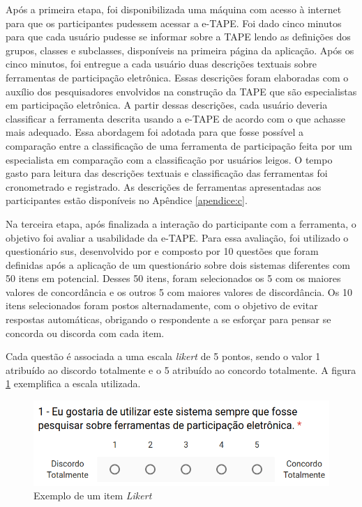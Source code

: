 \par
Após a primeira etapa, foi disponibilizada uma máquina com acesso à internet para que os participantes pudessem acessar a e-TAPE. Foi dado cinco minutos para que cada usuário pudesse se informar sobre a TAPE lendo as definições dos grupos, classes e subclasses,
disponíveis na primeira página da aplicação. 
Após os cinco minutos, foi entregue a cada usuário duas descrições textuais sobre ferramentas de participação eletrônica. Essas descrições foram elaboradas com o auxílio dos pesquisadores envolvidos na construção da TAPE que são especialistas em participação eletrônica. 
A partir dessas descrições, cada usuário deveria classificar a ferramenta descrita usando a e-TAPE de acordo com o que achasse mais adequado.
Essa abordagem foi adotada para que fosse possível a comparação entre a classificação de uma ferramenta de participação feita por um especialista em comparação com a classificação por usuários leigos. O tempo gasto para leitura das descrições textuais e classificação das ferramentas foi cronometrado e registrado.
As descrições de ferramentas apresentadas aos participantes estão disponíveis no Apêndice \ref{apendice:c}.

\par
Na terceira etapa, após finalizada a interação do participante com a ferramenta, o objetivo foi avaliar a usabilidade da e-TAPE.
Para essa avaliação, foi utilizado o questionário \acrfull{sus}, desenvolvido por  e composto por 10 questões que foram definidas após a aplicação de um questionário sobre dois sistemas diferentes com 50 itens em potencial. Desses 50 itens, foram selecionados os 5 com os maiores valores de concordância e os outros 5 com maiores valores de discordância. Os 10 itens selecionados
foram postos alternadamente, com o objetivo de evitar respostas automáticas, obrigando o respondente a se esforçar para pensar se concorda ou discorda com cada item. 

\par

Cada questão é associada a uma escala \textit{likert} de 5 pontos, sendo o valor 1 atribuído ao discordo totalmente e o 5 atribuído ao concordo totalmente.
A figura \ref{fig:exemplo-pergunta} exemplifica a escala utilizada.

\begin{figure}[!ht]
    \centering
    \includegraphics[scale=0.4]{./figuras/exemplo_pergunta.png}
    \caption{Exemplo de um item \textit{Likert}}
    \label{fig:exemplo-pergunta}
\end{figure}

